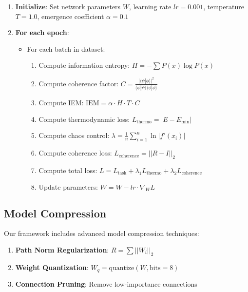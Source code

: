 \documentclass[12pt]{article}
\begin{document}
\begin{enumerate}
\item \textbf{Initialize}: Set network parameters $W$, learning rate $lr = 0.001$, temperature $T = 1.0$, emergence coefficient $\alpha = 0.1$

\item \textbf{For each epoch}:
\begin{itemize}
    \item For each batch in dataset:
    \begin{enumerate}
        \item Compute information entropy: $H = -\sum P(x)\log P(x)$
        \item Compute coherence factor: $C = \frac{|\langle \psi | \phi \rangle|^2}{\langle \psi | \psi \rangle \langle \phi | \phi \rangle}$
        \item Compute IEM: $\text{IEM} = \alpha \cdot H \cdot T \cdot C$
        \item Compute thermodynamic loss: $L_{\text{thermo}} = |E - E_{\min}|$
        \item Compute chaos control: $\lambda = \frac{1}{n} \sum_{i=1}^{n} \ln|f'(x_i)|$
        \item Compute coherence loss: $L_{\text{coherence}} = ||R - I||_2$
        \item Compute total loss: $L = L_{\text{task}} + \lambda_1 L_{\text{thermo}} + \lambda_2 L_{\text{coherence}}$
        \item Update parameters: $W = W - lr \cdot \nabla_W L$
    \end{enumerate}
\end{itemize}
\end{enumerate}

\subsection{Model Compression}

Our framework includes advanced model compression techniques:

\begin{enumerate}
\item \textbf{Path Norm Regularization}: $R = \sum ||W_i||_2$
\item \textbf{Weight Quantization}: $W_q = \text{quantize}(W, \text{bits}=8)$
\item \textbf{Connection Pruning}: Remove low-importance connections
\end{enumerate}
\end{document}
